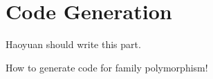 \section{Code Generation}

Haoyuan should write this part.

How to generate code for family polymorphism!

